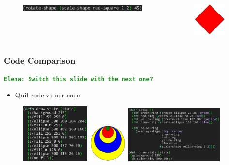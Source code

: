 \documentclass{beamer}
\newcommand{\comment}[1]{{\bf \tt  {#1}}}
\newcommand{\emcomment}[1]{\textcolor{ForestGreen}{\comment{Elena: {#1}}}}
\begin{document}
\begin{frame}[fragile]
\begin{itemize}
		\begin{columns}[t]
		\begin{column}{.45\textwidth}
			\begin{figure}[h]
			\vspace{-0.5cm}
			\includegraphics[width=6.5cm]{PresentationImages/rotateAndScaleRedCode.png}
			\end{figure}
		\end{column}
		\begin{column}{.3\textwidth}
			\begin{figure}[h]
			\includegraphics[width=1.7cm]{PresentationImages/red-rectangle-scale-rotate.png}
			\end{figure}		
		\end{column}
		\end{columns}
	\end{itemize}
\end{frame}

\begin{frame}
\frametitle{Code Comparison}
\emcomment{Switch this slide with the next one?}
	\begin{itemize}
		\item Quil code vs our code 
	\end{itemize}
	\begin{figure}
	\hspace{-0.4cm}
	\includegraphics[width=3.5cm]{PresentationImages/theirRingsCode.png}
	\hspace{0.1cm}
	\includegraphics[width=2cm]{PresentationImages/rings.png}
	\hspace{0.1cm}
	\includegraphics[width=5cm]{PresentationImages/ourRingsCode.png}
	\end{figure}
\end{frame}
\end{document}
